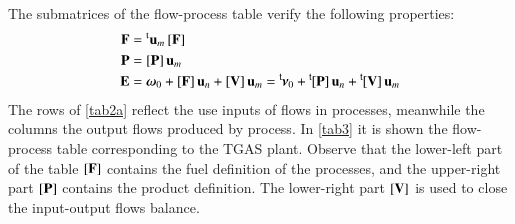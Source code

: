 \documentclass{ecos2018}
\begin{document}
The submatrices of the flow-process table verify the following properties:
\begin{align}
\mathbf{F}&=\prescript{\smash{\mathrm{t}}}{}{\mathbf{u}}_m\,[\mathbf{F}] \\
\mathbf{P}&=[\mathbf{P}]\,\mathbf{u}_m \\
\mathbf{E}&=\bm{\omega}_0 + [\mathbf{F}]\,\mathbf{u}_n + [\mathbf{V}]\,\mathbf{u}_m = \prescript{\smash{\mathsf{t}}}{}{\mskip-1mu}\bm{\nu}_0 + \prescript{\smash{\mathsf{t}}}{}{\mskip-1mu}[\mathbf{P}]\,\mathbf{u}_n + \prescript{\smash{\mathsf{t}}}{}{\mskip-1mu}[\mathbf{V}]\,\mathbf{u}_m
\end{align}
The rows of \cref{tab2a} reflect the use inputs of flows in processes, meanwhile the columns the output flows produced by process. In \cref{tab3} it is shown the flow-process table corresponding to the TGAS plant. Observe that the lower-left part of the table $\left[ \textbf{F} \right]$ contains the fuel definition of the processes, and the upper-right part $\left[ \textbf{P} \right]$ contains the product definition. The lower-right part $\left[ \textbf{V} \right]$ is used to close the input-output flows balance.
\end{document}
